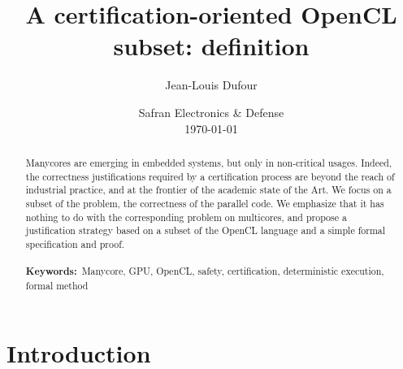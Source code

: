 \documentclass[a4paper,10pt]{article} %
\title{A certification-oriented OpenCL subset: definition}
\author{Jean-Louis Dufour}
\date{Safran Electronics \& Defense\\
\today
}
\begin{document}
\maketitle

\begin{abstract}
Manycores are emerging in embedded systems, but only in non-critical usages.
Indeed, the correctness justifications required by a certification process are  beyond the reach of industrial practice,
and at the frontier of the academic state of the Art.
We focus on a subset of the problem, the correctness of the parallel code.
We emphasize that it has nothing to do with the corresponding problem on multicores,
and propose a justification strategy based on a subset of the OpenCL language and a simple formal specification and proof.
\\\\
\textbf{Keywords:}\ Manycore, GPU, OpenCL, safety, certification, deterministic execution, formal method
\end{abstract}



\section{Introduction}

\cite{eigenmann1991experience}


\cite{gupta1997privatization}
\end{document}
